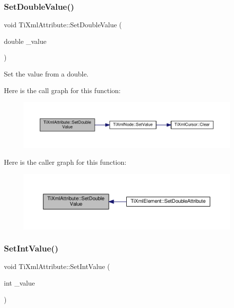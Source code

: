 \subsubsection{\texorpdfstring{Set\+Double\+Value()}{SetDoubleValue()}}
{\footnotesize\ttfamily void Ti\+Xml\+Attribute\+::\+Set\+Double\+Value (\begin{DoxyParamCaption}\item[{double}]{\+\_\+value }\end{DoxyParamCaption})}



Set the value from a double. 

Here is the call graph for this function\+:
\nopagebreak
\begin{figure}[H]
\begin{center}
\leavevmode
\includegraphics[width=350pt]{class_ti_xml_attribute_a0316da31373496c4368ad549bf711394_cgraph}
\end{center}
\end{figure}
Here is the caller graph for this function\+:
\nopagebreak
\begin{figure}[H]
\begin{center}
\leavevmode
\includegraphics[width=350pt]{class_ti_xml_attribute_a0316da31373496c4368ad549bf711394_icgraph}
\end{center}
\end{figure}
\mbox{\label{class_ti_xml_attribute_a7e065df640116a62ea4f4b7da5449cc8}} 
\subsubsection{\texorpdfstring{Set\+Int\+Value()}{SetIntValue()}}
{\footnotesize\ttfamily void Ti\+Xml\+Attribute\+::\+Set\+Int\+Value (\begin{DoxyParamCaption}\item[{int}]{\+\_\+value }\end{DoxyParamCaption})}



